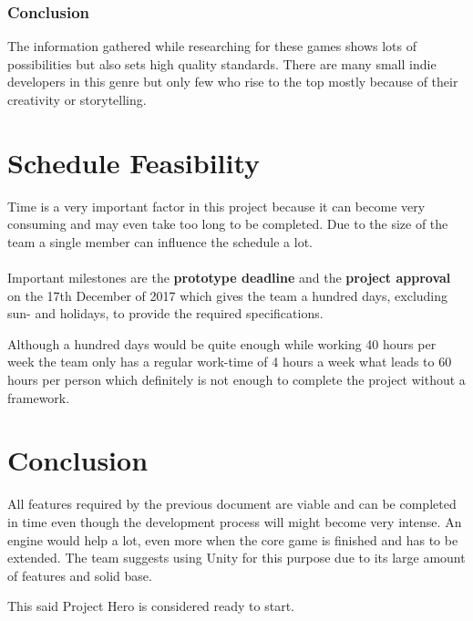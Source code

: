 \documentclass[11pt]{article}
\begin{document}
\subsubsection{Conclusion}
The information gathered while researching for these games shows lots of possibilities but also sets high quality standards. 
There are many small indie developers in this genre but only few who rise to the top mostly because of their creativity or storytelling.

\newpage

\section{Schedule Feasibility}
Time is a very important factor in this project because it can become very consuming and may even take too long to be completed.
Due to the size of the team a single member can influence the schedule a lot.
\\
\\
Important milestones are the \textbf{prototype deadline} and the \textbf{project approval} on the 17th December of 2017 which gives the team a hundred days, excluding sun- and holidays, to provide the required specifications.

Although a hundred days would be quite enough while working 40 hours per week the team only has a regular work-time of 4 hours a week what leads to 60 hours per person which definitely is not enough to complete the project without a framework.

\section{Conclusion}
All features required by the previous document are viable and can be completed in time even though the development process will might become very intense.
An engine would help a lot, even more when the core game is finished and has to be extended. The team suggests using Unity for this purpose due to its large amount of features and solid base.

This said Project Hero is considered ready to start.
\end{document}

